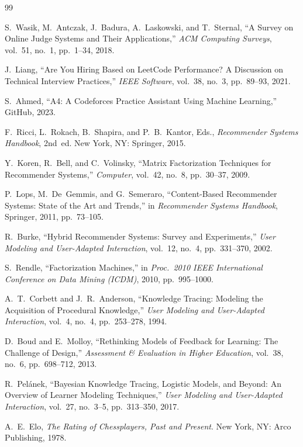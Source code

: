 \documentclass[12pt,a4paper]{article}
\begin{document}
\begin{thebibliography}{99}

S.~Wasik, M.~Antczak, J.~Badura, A.~Laskowski, and T.~Sternal, ``A Survey on Online Judge Systems and Their Applications,'' \emph{ACM Computing Surveys}, vol.~51, no.~1, pp.~1--34, 2018.

J.~Liang, ``Are You Hiring Based on LeetCode Performance? A Discussion on Technical Interview Practices,'' \emph{IEEE Software}, vol.~38, no.~3, pp.~89--93, 2021.

S.~Ahmed, ``A4: A Codeforces Practice Assistant Using Machine Learning,'' GitHub, 2023.

F.~Ricci, L.~Rokach, B.~Shapira, and P.~B.~Kantor, Eds., \emph{Recommender Systems Handbook}, 2nd~ed. New York, NY: Springer, 2015.

Y.~Koren, R.~Bell, and C.~Volinsky, ``Matrix Factorization Techniques for Recommender Systems,'' \emph{Computer}, vol.~42, no.~8, pp.~30--37, 2009.

P.~Lops, M.~De~Gemmis, and G.~Semeraro, ``Content-Based Recommender Systems: State of the Art and Trends,'' in \emph{Recommender Systems Handbook}, Springer, 2011, pp.~73--105.

R.~Burke, ``Hybrid Recommender Systems: Survey and Experiments,'' \emph{User Modeling and User-Adapted Interaction}, vol.~12, no.~4, pp.~331--370, 2002.

S.~Rendle, ``Factorization Machines,'' in \emph{Proc.\ 2010 IEEE International Conference on Data Mining (ICDM)}, 2010, pp.~995--1000.

A.~T.~Corbett and J.~R.~Anderson, ``Knowledge Tracing: Modeling the Acquisition of Procedural Knowledge,'' \emph{User Modeling and User-Adapted Interaction}, vol.~4, no.~4, pp.~253--278, 1994.

D.~Boud and E.~Molloy, ``Rethinking Models of Feedback for Learning: The Challenge of Design,'' \emph{Assessment \& Evaluation in Higher Education}, vol.~38, no.~6, pp.~698--712, 2013.

R.~Pel\'{a}nek, ``Bayesian Knowledge Tracing, Logistic Models, and Beyond: An Overview of Learner Modeling Techniques,'' \emph{User Modeling and User-Adapted Interaction}, vol.~27, no.~3--5, pp.~313--350, 2017.

A.~E.~Elo, \emph{The Rating of Chessplayers, Past and Present}. New York, NY: Arco Publishing, 1978.


\end{thebibliography}
\end{document}
